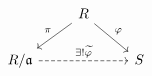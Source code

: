 \documentclass{article}
\begin{document}
    \begin{equation*}
        \begin{tikzcd}
            & R \ar[dl, "\pi"'] \ar[dr, "\phi"] & \\
            R/\mf{a} \ar[rr, "\ex!\widetilde{\phi}", dashed] & & S
        \end{tikzcd}
    \end{equation*}
\end{document}
